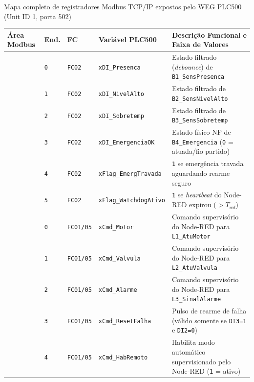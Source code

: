 \begin{quadro}[htb]
  \centering
  \SingleSpacing
  \caption{Mapa completo de registradores Modbus TCP/IP expostos pelo WEG PLC500 (Unit ID 1, porta 502)}
  \label{quadro:mapa_modbus}
  \footnotesize
  \begin{tabularx}{\textwidth}{|>{\RaggedRight\arraybackslash}p{2.10cm}|p{0.80cm}|p{1.25cm}|p{3.60cm}|L|}
    \hline
    \textbf{Área Modbus} & \textbf{End.} & \textbf{FC} & \textbf{Variável PLC500} & \textbf{Descrição Funcional e Faixa de Valores} \\
    \hline
      & \texttt{0} & \texttt{FC02} & \texttt{xDI\_Presenca} & Estado filtrado (\textit{debounce}) de \texttt{B1\_SensPresenca} \\ 
      & \texttt{1} & \texttt{FC02} & \texttt{xDI\_NivelAlto} & Estado filtrado de \texttt{B2\_SensNivelAlto} \\ 
      & \texttt{2} & \texttt{FC02} & \texttt{xDI\_Sobretemp} & Estado filtrado de \texttt{B3\_SensSobretemp} \\ 
      & \texttt{3} & \texttt{FC02} & \texttt{xDI\_EmergenciaOK} & Estado físico NF de \texttt{B4\_Emergencia} (\texttt{0} = atuada/fio partido) \\ 
      & \texttt{4} & \texttt{FC02} & \texttt{xFlag\_EmergTravada} & \texttt{1} se emergência travada aguardando rearme seguro \\ 
      & \texttt{5} & \texttt{FC02} & \texttt{xFlag\_WatchdogAtivo} & \texttt{1} se \textit{heartbeat} do Node-RED expirou ($> T_{wd}$) \\
    \hline
      & \texttt{0} & \texttt{FC01/05} & \texttt{xCmd\_Motor} & Comando supervisório do Node-RED para \texttt{L1\_AtuMotor} \\ 
      & \texttt{1} & \texttt{FC01/05} & \texttt{xCmd\_Valvula} & Comando supervisório do Node-RED para \texttt{L2\_AtuValvula} \\ 
      & \texttt{2} & \texttt{FC01/05} & \texttt{xCmd\_Alarme} & Comando supervisório do Node-RED para \texttt{L3\_SinalAlarme} \\ 
      & \texttt{3} & \texttt{FC01/05} & \texttt{xCmd\_ResetFalha} & Pulso de rearme de falha (válido somente se \texttt{DI3=1} e \texttt{DI2=0}) \\ 
      & \texttt{4} & \texttt{FC01/05} & \texttt{xCmd\_HabRemoto} & Habilita modo automático supervisionado pelo Node-RED (\texttt{1} = ativo) \\

\end{tabularx}
\end{quadro}
